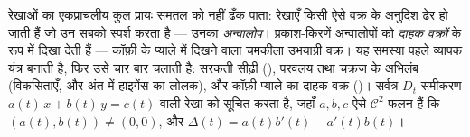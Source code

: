 \begin{problem}[{सप्ताहांत समस्या --- अन्वालोप यंत्र और
चार शास्त्रीय वक्र}]\label{pb:b2:curves:1}
रेखाओं का एकप्राचलीय कुल प्रायः समतल को  नहीं ढँक
पाता: रेखाएँ किसी ऐसे वक्र के अनुदिश ढेर हो जाती हैं जो उन सबको
स्पर्श करता है --- उनका \emph{अन्वालोप}। प्रकाश-किरणें
अन्वालोपों को \emph{दाहक वक्रों} के रूप में दिखा देती हैं --- कॉफ़ी के
प्याले में दिखने वाला चमकीला उभयाग्री वक्र। यह समस्या पहले व्यापक
 यंत्र बनाती है, फिर उसे चार बार चलाती है: सरकती सीढ़ी
(), परवलय तथा चक्रज के अभिलंब (विकसिताएँ, और अंत में हाइगेंस
का लोलक), और कॉफ़ी-प्याले का दाहक वक्र ()। सर्वत्र $D_t$
समीकरण $a(t)\,x + b(t)\,y = c(t)$ वाली रेखा को सूचित करता है, जहाँ $a, b, c$
ऐसे $\mathcal C^2$ फलन हैं कि $(a(t), b(t)) \neq (0,0)$,
और $\Delta(t) = a(t)b'(t) - a'(t)b(t)$।


\end{problem}
